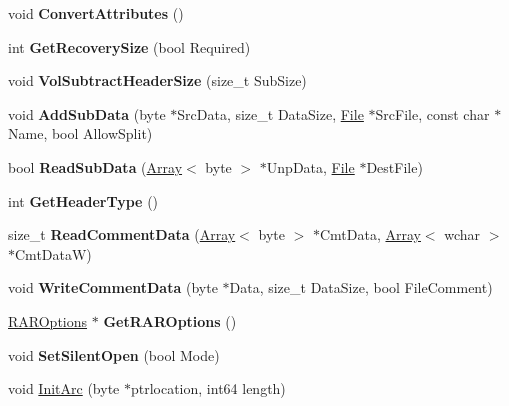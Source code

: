 \begin{DoxyCompactItemize}
\item 
\hypertarget{class_archive_ab068d6a33ef1cb87ace818fd454ed8da}{void {\bfseries Convert\-Attributes} ()}\label{class_archive_ab068d6a33ef1cb87ace818fd454ed8da}

\item 
\hypertarget{class_archive_ad5b9b5fbcfeb654595d6c3cb51d69144}{int {\bfseries Get\-Recovery\-Size} (bool Required)}\label{class_archive_ad5b9b5fbcfeb654595d6c3cb51d69144}

\item 
\hypertarget{class_archive_ac495c85ddc4f0b91c1bde4a8a2a019c4}{void {\bfseries Vol\-Subtract\-Header\-Size} (size\-\_\-t Sub\-Size)}\label{class_archive_ac495c85ddc4f0b91c1bde4a8a2a019c4}

\item 
\hypertarget{class_archive_a57d2e1f83e999a872db15691a7b0ec5c}{void {\bfseries Add\-Sub\-Data} (byte $\ast$Src\-Data, size\-\_\-t Data\-Size, \hyperlink{class_file}{File} $\ast$Src\-File, const char $\ast$Name, bool Allow\-Split)}\label{class_archive_a57d2e1f83e999a872db15691a7b0ec5c}

\item 
\hypertarget{class_archive_a005b58f3ac7bcfcc875cc9416f2f97da}{bool {\bfseries Read\-Sub\-Data} (\hyperlink{class_array}{Array}$<$ byte $>$ $\ast$Unp\-Data, \hyperlink{class_file}{File} $\ast$Dest\-File)}\label{class_archive_a005b58f3ac7bcfcc875cc9416f2f97da}

\item 
\hypertarget{class_archive_a190ef572a45ee772402e28f359b4f60b}{int {\bfseries Get\-Header\-Type} ()}\label{class_archive_a190ef572a45ee772402e28f359b4f60b}

\item 
\hypertarget{class_archive_a766b2eed7cae05eec0d82c824bcadedc}{size\-\_\-t {\bfseries Read\-Comment\-Data} (\hyperlink{class_array}{Array}$<$ byte $>$ $\ast$Cmt\-Data, \hyperlink{class_array}{Array}$<$ wchar $>$ $\ast$Cmt\-Data\-W)}\label{class_archive_a766b2eed7cae05eec0d82c824bcadedc}

\item 
\hypertarget{class_archive_a96ad955b4bcbaccc091f8c994950e583}{void {\bfseries Write\-Comment\-Data} (byte $\ast$Data, size\-\_\-t Data\-Size, bool File\-Comment)}\label{class_archive_a96ad955b4bcbaccc091f8c994950e583}

\item 
\hypertarget{class_archive_ab8bb60ec32cb017daa87b413947feb36}{\hyperlink{class_r_a_r_options}{R\-A\-R\-Options} $\ast$ {\bfseries Get\-R\-A\-R\-Options} ()}\label{class_archive_ab8bb60ec32cb017daa87b413947feb36}

\item 
\hypertarget{class_archive_a7dfd26057e52cc9ee075b6ed710a1b83}{void {\bfseries Set\-Silent\-Open} (bool Mode)}\label{class_archive_a7dfd26057e52cc9ee075b6ed710a1b83}

\item 
void \hyperlink{class_archive_a03292e03b219b4ba6f471891278252ed}{Init\-Arc} (byte $\ast$ptrlocation, int64 length)
\end{DoxyCompactItemize}
